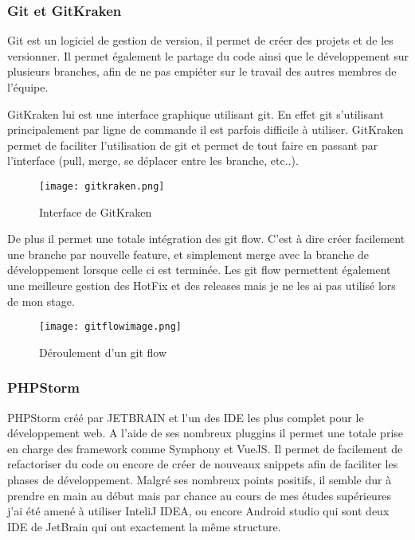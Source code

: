 \subsubsection{Git et GitKraken}
Git est un logiciel de gestion de version, il permet de créer des projets et de les versionner. Il permet également le partage du code ainsi que le développement sur plusieurs branches, afin de ne pas empiéter sur le travail des autres membres de l'équipe.

GitKraken lui est une interface graphique utilisant git. En effet git s'utilisant principalement par ligne de commande il est parfois difficile à utiliser. GitKraken permet de faciliter l'utilisation de git et permet de tout faire en passant par l'interface (pull, merge, se déplacer entre les branche, etc..).

\begin{figure}[htbp]
    \center
    \texttt{[image: gitkraken.png]}
    \caption{Interface de  GitKraken}
\end{figure}

De plus il permet une totale intégration des git flow. C'est à dire créer facilement une branche par nouvelle feature, et simplement merge avec la branche de développement lorsque celle ci est terminée.
Les git flow permettent également une meilleure gestion des HotFix et des releases mais je ne les ai pas utilisé lors de mon stage. 

\begin{figure}[htbp]
    \center
\texttt{[image: gitflowimage.png]}
\caption{Déroulement d'un git flow}
\end{figure}


\subsubsection{PHPStorm}

PHPStorm créé par JETBRAIN et l'un des IDE les plus complet pour le développement web.
A l'aide de ses nombreux pluggins il permet une totale prise en charge des framework comme Symphony et VueJS. Il permet de facilement de refactoriser du code  ou encore de créer de nouveaux snippets afin de faciliter les phases de développement.
Malgré ses nombreux points positifs, il semble dur à prendre en main au début mais par chance au cours de mes études supérieures j'ai été amené à utiliser InteliJ IDEA, ou encore Android studio qui sont deux IDE de JetBrain qui ont exactement la même structure. 

